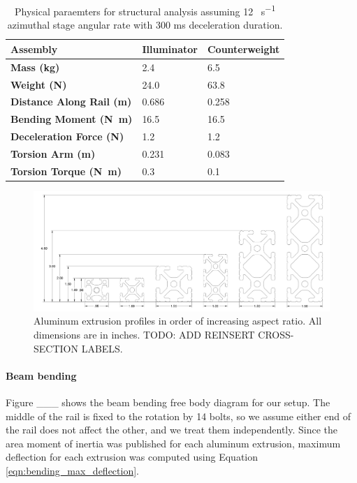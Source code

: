 \begin{table}[htbp]
    \renewcommand{\arraystretch}{1.25}
    \caption{Physical paraemters for structural analysis assuming 12 \si{\deg\per\s} azimuthal stage angular rate with 300 \si{\ms} deceleration duration.}
    \begin{center}
        \begin{tabular}{ l l l }
        \toprule[2pt]
        \textbf{Assembly} & \textbf{Illuminator} & \textbf{Counterweight} \\
        \midrule[0.75pt]
        \textbf{Mass (\si{\kg})} & 2.4 & 6.5 \\
        \textbf{Weight (\si{\N})} & 24.0 & 63.8 \\
        \textbf{Distance Along Rail (\si{\metre})} & 0.686 & 0.258 \\
        \textbf{Bending Moment (\si{\N\m})} & 16.5 & 16.5 \\
        \textbf{Deceleration Force (\si{\N})} & 1.2 & 1.2 \\
        \textbf{Torsion Arm (\si{\metre})} & 0.231 & 0.083 \\
        \textbf{Torsion Torque (\si{\N\m})} & 0.3 & 0.1 \\
        \bottomrule[2pt]
        \end{tabular}
    \end{center}
    \label{tab:structural_analysis_params}
\end{table}

\begin{figure}
    \centering
    \includegraphics[width=\linewidth]{../figures/cross-sections.png}
    \caption{Aluminum extrusion profiles in order of increasing aspect ratio. All dimensions are in inches. TODO: ADD REINSERT CROSS-SECTION LABELS.}
    \label{fig:beam_profiles}
\end{figure}

\paragraph{Beam bending}
Figure \_\_\_ shows the beam bending free body diagram for our setup. The middle of the rail is fixed to the rotation by 14 bolts, so we assume either end of the rail does not affect the other, and we treat them independently. Since the area moment of inertia was published for each aluminum extrusion, maximum deflection for each extrusion was computed using Equation \ref{eqn:bending_max_deflection}.


